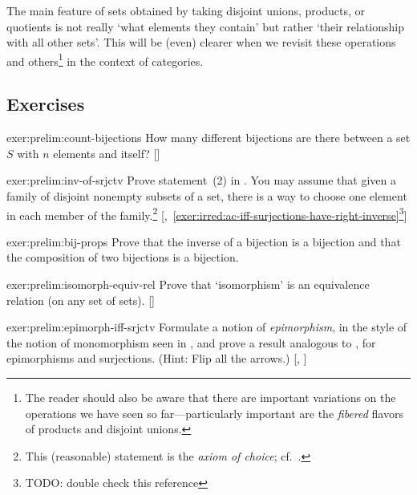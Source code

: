 The main feature of sets obtained by taking disjoint unions, products,
or quotients is not really `what elements they contain' but rather
`their relationship with all other sets'. This will be (even) clearer
when we revisit these operations and others\footnote{The reader should
  also be aware that there are important variations on the operations
  we have seen so far---particularly important are the \emph{fibered}
  flavors of products and disjoint unions.} in the context of
categories.

\subsection*{Exercises}

\begin{exer}{}{exer:prelim:count-bijections}
  \exerused{} How many different bijections are there between a set
  $S$ with $n$ elements and itself?
  []
\end{exer}

\begin{exer}{}{exer:prelim:inv-of-srjctv}
  \exerused{} Prove statement~(2) in . You may
  assume that given a family of disjoint nonempty subsets of a set,
  there is a way to choose one element in each member of the
  family.\footnote{This (reasonable) statement is the \emph{axiom of
      choice}; cf.\ .}
  [,~\ref{exer:irred:ac-iff-surjections-have-right-inverse}\footnote{TODO:
    double check this reference}]
\end{exer}

\begin{exer}{}{exer:prelim:bij-props}
  Prove that the inverse of a bijection is a bijection and that the
  composition of two bijections is a bijection.
\end{exer}

\begin{exer}{}{exer:prelim:isomorph-equiv-rel}
  \exerused{} Prove that `isomorphism' is an equivalence relation (on
  any set of sets). []
\end{exer}

\begin{exer}{}{exer:prelim:epimorph-iff-srjctv}
  \exerused{} Formulate a notion of \emph{epimorphism}, in the style
  of the notion of monomorphism seen in
  ,
  and prove a result analogous to
  , for epimorphisms and
  surjections. (Hint: Flip all the arrows.)
  [,
  ]
\end{exer}

